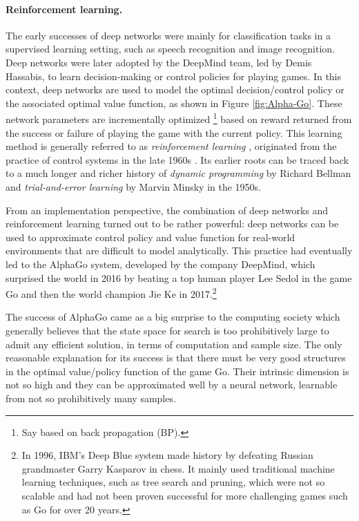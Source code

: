 \documentclass[\toplevelprefix/book-main.tex]{subfiles}
\begin{document}
\paragraph{Reinforcement learning.}
The early successes of deep networks were mainly for classification tasks in a supervised learning setting, such as speech recognition and image recognition. Deep networks were later adopted by the DeepMind team, led by Demis Hassabis, to learn decision-making or control policies for playing games. In this context, deep networks are used to model the optimal decision/control policy or the associated optimal value function, as shown in Figure \ref{fig:Alpha-Go}. These network parameters are incrementally optimized \footnote{Say based on back propagation (BP).} based on reward returned from the success or failure of playing the game with the current policy. This learning method is generally referred to as {\em reinforcement learning} \cite{Sutton-Barto}, originated from the practice of control systems in the late 1960s \cite{Waltz1965AHA,Mendel1970ReinforcementlearningCA}. Its earlier roots can be traced back to a much longer and richer history of {\em dynamic programming} by Richard Bellman \cite{Bellman-DP} and {\em trial-and-error learning} by Marvin Minsky \cite{Minsky-1954} in the 1950s. 

From an implementation perspective, the combination of deep networks and reinforcement learning turned out to be rather powerful: deep networks can be used to approximate control policy and value function for real-world environments that are difficult to model analytically. This practice had eventually led to the AlphaGo system, developed by the company DeepMind, which surprised the world in 2016 by beating a top human player Lee Sedol in the game Go and then the world champion Jie Ke in 2017.\footnote{In 1996, IBM's Deep Blue system made history by defeating Russian grandmaster Garry Kasparov in chess. It mainly used traditional machine learning techniques, such as tree search and pruning, which were not so scalable and had not been proven successful for more challenging games such as Go for over 20 years.} 

The success of AlphaGo came as a big surprise to the computing society which generally believes that the state space for search is too prohibitively large to admit any efficient solution, in terms of computation and sample size. The only reasonable explanation for its success is that there must be very good structures in the optimal value/policy function of the game Go. Their intrinsic dimension is not so high and they can be approximated well by a neural network, learnable from not so prohibitively many samples. 
\end{document}
